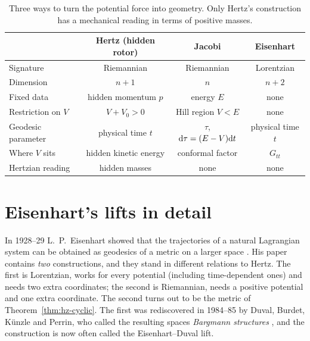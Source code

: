 \begin{table}[t]
\centering
\small
\begin{tabular}{@{}lccc@{}}
\toprule
 & Hertz (hidden rotor) & Jacobi & Eisenhart\\
\midrule
Signature & Riemannian & Riemannian & Lorentzian\\
Dimension & $n+1$ & $n$ & $n+2$\\
Fixed data & hidden momentum $p$ & energy $E$ & none\\
Restriction on $V$ & $V+V_0>0$ & Hill region $V<E$ & none\\
Geodesic parameter & physical time $t$ & $\tau$, $\mathrm{d}\tau=(E-V)\mathrm{d} t$ & physical time $t$\\
Where $V$ sits & hidden kinetic energy & conformal factor & $G_{tt}$\\
Hertzian reading & hidden masses & none & none\\
\bottomrule
\end{tabular}
\caption{Three ways to turn the potential force into geometry. Only Hertz's
construction has a mechanical reading in terms of positive masses.}
\label{tab:hz-compare}
\end{table}

%

\section{Eisenhart's lifts in detail}
\label{sec:hz-eisenhart}

In 1928--29 L.~P.~Eisenhart showed that the trajectories of a natural
Lagrangian system can be obtained as geodesics of a metric on a larger space
\cite{hdp:eisenhart1929}. His paper contains \emph{two} constructions,
and they stand in different relations to Hertz. The first is
Lorentzian, works for every potential (including time-dependent ones) and
needs two extra coordinates; the second is Riemannian, needs a positive
potential and one extra coordinate. The second turns out to be
the metric of Theorem~\ref{thm:hz-cyclic}. The first was rediscovered
in 1984--85 by Duval, Burdet, K\"unzle and Perrin, who called the resulting
spaces \emph{Bargmann structures} \cite{hdp:duval1985,hdp:duval1991}, and
the construction is now often called the Eisenhart--Duval lift.

